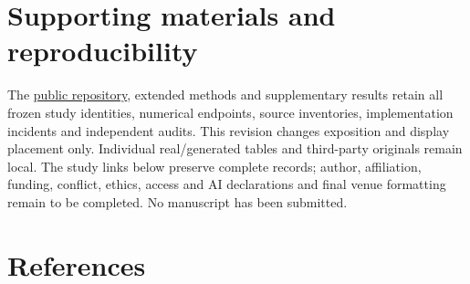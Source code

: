 \documentclass[10pt,twocolumn]{article}
\begin{document}
\balance

\section*{Supporting materials and reproducibility}

The \href{https://github.com/ziwang11112/evidence-guided-virtual-cohorts-2026}{public repository}, extended methods and supplementary results retain all frozen study identities, numerical endpoints, source inventories, implementation incidents and independent audits. This revision changes exposition and display placement only. Individual real/generated tables and third-party originals remain local. The study links below preserve complete records; author, affiliation, funding, conflict, ethics, access and AI declarations and final venue formatting remain to be completed. No manuscript has been submitted.


\clearpage

\nobalance

\section*{References}

\begingroup\fontsize{8.5}{10}\selectfont
\end{document}
